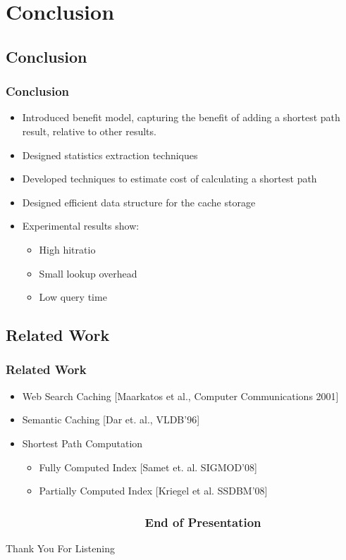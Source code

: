 \section{Conclusion}
\subsection{Conclusion} %
\begin{frame}[red] %
\frametitle{Conclusion}

\begin{itemize}
\item Introduced benefit model, capturing the benefit of adding a shortest path result, relative to other results.
\item Designed statistics extraction techniques 
\item Developed techniques to estimate cost of calculating a shortest path
\item Designed efficient data structure for the cache storage
\vspace{2em}
\item Experimental results show:
  \begin{itemize}
  \item High hitratio
  \item Small lookup overhead
  \item Low query time
  \end{itemize}
\end{itemize}

 
\end{frame}


\subsection{Related Work}
\begin{frame}[red] %
\frametitle{Related Work} %

\begin{itemize}
\item Web Search Caching [Maarkatos et al., Computer Communications 2001]

\item Semantic Caching [Dar et. al., VLDB'96] %

\item Shortest Path Computation
 \begin{itemize}
  \item Fully Computed Index [Samet et. al. SIGMOD'08]
  \item Partially Computed Index [Kriegel et al. SSDBM'08]
  \end{itemize}
\end{itemize}
\end{frame}


\begin{frame}[plain] %
\frametitle{\;~~~~~~~~~~~~~~~~~~~~~End of Presentation}

\vspace{9em}
\begin{center}
    \Huge Thank You For Listening
\end{center}

\end{frame}
